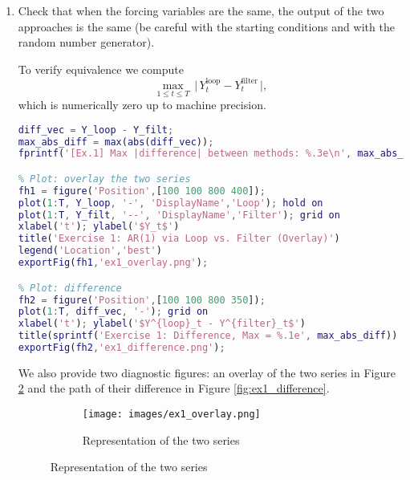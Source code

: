 \documentclass[dvipsnames,11pt]{article}
\begin{document}
\begin{enumerate}[label=\alph*.]
\begin{solution}
            \end{solution}

        \item Check that when the forcing variables are the same, the output of the two approaches is the same (be careful with the starting conditions and with the random number generator).

            \begin{solution}

                To verify equivalence we compute
                \[
                  \max_{1\le t\le T}\,\big|\,Y^{\text{loop}}_t - Y^{\text{filter}}_t\,\big|,
                \]
                which is numerically zero up to machine precision.

\begin{lstlisting}[language=Matlab]
% (c) Check equality (up to machine precision)
diff_vec = Y_loop - Y_filt;
max_abs_diff = max(abs(diff_vec));
fprintf('[Ex.1] Max |difference| between methods: %.3e\n', max_abs_diff);

% Plot: overlay the two series
fh1 = figure('Position',[100 100 800 400]);
plot(1:T, Y_loop, '-', 'DisplayName','Loop'); hold on
plot(1:T, Y_filt, '--', 'DisplayName','Filter'); grid on
xlabel('t'); ylabel('$Y_t$')
title('Exercise 1: AR(1) via Loop vs. Filter (Overlay)')
legend('Location','best')
exportFig(fh1,'ex1_overlay.png');

% Plot: difference
fh2 = figure('Position',[100 100 800 350]);
plot(1:T, diff_vec, '-'); grid on
xlabel('t'); ylabel('$Y^{loop}_t - Y^{filter}_t$')
title(sprintf('Exercise 1: Difference, Max = %.1e', max_abs_diff))
exportFig(fh2,'ex1_difference.png');
\end{lstlisting}

                We also provide two diagnostic figures: an overlay of the two series in Figure \ref{fig:ex1_overlay} and the path of their difference in Figure \ref{fig:ex1_difference}.

                \begin{figure}[h]
                     \centering
                     \begin{subfigure}[b]{0.99\textwidth}
                         \centering
                         \texttt{[image: images/ex1\_overlay.png]}
                         \caption{Representation of the two series}
                         \label{fig:ex1_overlay}
                         

\end{subfigure}
\end{figure}
\end{solution}
\end{enumerate}
\end{document}
